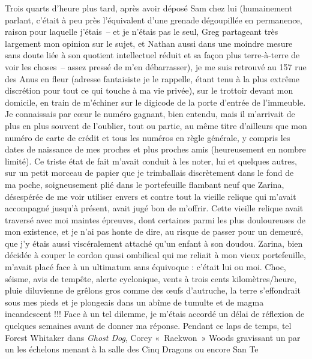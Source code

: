 
\illusloflabel{}%
%
Trois quarts d’heure plus tard, après avoir déposé Sam chez lui (humainement parlant, c’était à peu près l’équivalent d’une grenade dégoupillée en permanence, raison pour laquelle j’étais~-- et je n’étais pas le seul, Greg partageant très largement mon opinion sur le sujet, et Nathan aussi dans une moindre mesure sans doute liée à son quotient intellectuel réduit et sa façon plus terre-à-terre de voir les choses~-- assez pressé de m’en débarrasser), je me suis retrouvé au 157 rue des Anus en fleur (adresse fantaisiste je le rappelle, étant tenu à la plus extrême discrétion pour tout ce qui touche à ma vie privée), sur le trottoir devant mon domicile, en train de m’échiner sur le digicode de la porte d’entrée de l’immeuble. Je connaissais par cœur le numéro gagnant, bien entendu, mais il m’arrivait de plus en plus souvent de l’oublier, tout ou partie, au même titre d’ailleurs que mon numéro de carte de crédit et tous les numéros en règle générale, y compris les dates de naissance de mes proches et plus proches amis (heureusement en nombre limité). Ce triste état de fait m’avait conduit à les noter, lui et quelques autres, sur un petit morceau de papier que je trimballais discrètement dans le fond de ma poche, soigneusement plié dans le portefeuille flambant neuf que Zarina, désespérée de me voir utiliser envers et contre tout la vieille relique qui m’avait accompagné jusqu’à présent, avait jugé bon de m’offrir. Cette vieille relique avait traversé avec moi maintes épreuves, dont certaines parmi les plus douloureuses de mon existence, et je n’ai pas honte de dire, au risque de passer pour un demeuré, que j’y étais aussi viscéralement attaché qu’un enfant à son doudou. Zarina, bien décidée à couper le cordon quasi ombilical qui me reliait à mon vieux portefeuille, m’avait placé face à un ultimatum sans équivoque : c’était lui ou moi. Choc, séisme, avis de tempête, alerte cyclonique, vents à trois cents kilomètres/heure, pluie diluvienne de grêlons gros comme des œufs d’autruche, la terre s’effondrait sous mes pieds et je plongeais dans un abîme de tumulte et de magma incandescent !!! Face à un tel dilemme, je m’étais accordé un délai de réflexion de quelques semaines avant de donner ma réponse. Pendant ce laps de temps, tel Forest Whitaker dans \textit{Ghost Dog}, Corey «~Raekwon~» Woods gravissant un par un les échelons menant à la salle des Cinq Dragons ou encore San Te 